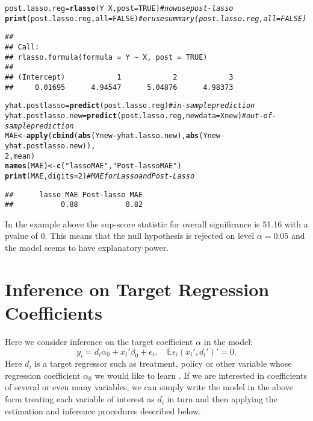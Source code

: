 \documentclass{amsart}\usepackage[]{graphicx}\usepackage[]{color}
\makeatletter
\newcommand{\hlnum}[1]{\textcolor[rgb]{0.686,0.059,0.569}{#1}}%
\newcommand{\hlstr}[1]{\textcolor[rgb]{0.192,0.494,0.8}{#1}}%
\newcommand{\hlcom}[1]{\textcolor[rgb]{0.678,0.584,0.686}{\textit{#1}}}%
\newcommand{\hlopt}[1]{\textcolor[rgb]{0,0,0}{#1}}%
\newcommand{\hlstd}[1]{\textcolor[rgb]{0.345,0.345,0.345}{#1}}%
\newcommand{\hlkwb}[1]{\textcolor[rgb]{0.69,0.353,0.396}{#1}}%
\newcommand{\hlkwc}[1]{\textcolor[rgb]{0.333,0.667,0.333}{#1}}%
\newcommand{\hlkwd}[1]{\textcolor[rgb]{0.737,0.353,0.396}{\textbf{#1}}}%
\newenvironment{kframe}{%
 \def\at@end@of@kframe{}%
 \ifinner\ifhmode%
  \def\at@end@of@kframe{\end{minipage}}%
  \begin{minipage}{\columnwidth}%
 \fi\fi%
 \def\FrameCommand##1{\hskip\@totalleftmargin \hskip-\fboxsep
 \colorbox{shadecolor}{##1}\hskip-\fboxsep
     \hskip-\linewidth \hskip-\@totalleftmargin \hskip\columnwidth}%
 \MakeFramed {\advance\hsize-\width
   \@totalleftmargin\z@ \linewidth\hsize
   \@setminipage}}%
 {\par\unskip\endMakeFramed%
 \at@end@of@kframe}
\newenvironment{knitrout}{}{} %
\makeatother
\begin{document}
\begin{knitrout}
\begin{kframe}
\begin{alltt}
\hlstd{post.lasso.reg} \hlkwb{=} \hlkwd{rlasso}\hlstd{(Y} \hlopt{~} \hlstd{X,} \hlkwc{post} \hlstd{=} \hlnum{TRUE}\hlstd{)}  \hlcom{#now use post-lasso}
\hlkwd{print}\hlstd{(post.lasso.reg,} \hlkwc{all} \hlstd{=} \hlnum{FALSE}\hlstd{)}  \hlcom{# or use  summary(post.lasso.reg, all=FALSE) }
\end{alltt}
\begin{verbatim}
## 
## Call:
## rlasso.formula(formula = Y ~ X, post = TRUE)
## 
## (Intercept)            1            2            3  
##     0.01695      4.94547      5.04876      4.98373
\end{verbatim}
\begin{alltt}
\hlstd{yhat.postlasso} \hlkwb{=} \hlkwd{predict}\hlstd{(post.lasso.reg)}  \hlcom{#in-sample prediction}
\hlstd{yhat.postlasso.new} \hlkwb{=} \hlkwd{predict}\hlstd{(post.lasso.reg,} \hlkwc{newdata} \hlstd{= Xnew)}  \hlcom{#out-of-sample prediction}
\hlstd{MAE} \hlkwb{<-} \hlkwd{apply}\hlstd{(}\hlkwd{cbind}\hlstd{(}\hlkwd{abs}\hlstd{(Ynew} \hlopt{-} \hlstd{yhat.lasso.new),} \hlkwd{abs}\hlstd{(Ynew} \hlopt{-} \hlstd{yhat.postlasso.new)),}
    \hlnum{2}\hlstd{, mean)}
\hlkwd{names}\hlstd{(MAE)} \hlkwb{<-} \hlkwd{c}\hlstd{(}\hlstr{"lasso MAE"}\hlstd{,} \hlstr{"Post-lasso MAE"}\hlstd{)}
\hlkwd{print}\hlstd{(MAE,} \hlkwc{digits} \hlstd{=} \hlnum{2}\hlstd{)}  \hlcom{# MAE for Lasso and Post-Lasso}
\end{alltt}
\begin{verbatim}
##      lasso MAE Post-lasso MAE 
##           0.88           0.82
\end{verbatim}
\end{kframe}
\end{knitrout}

In the example above the sup-score statistic for overall significance is 51.16 with a pvalue of 0. This means that the null hypothesis is rejected on level $\alpha=0.05$ and the model seems to have explanatory power.

\section{Inference on Target Regression Coefficients}

Here we consider inference on the target coefficient $\alpha$ in the model:
$$
y_i = d_i \alpha_0 + x_i'\beta_0 + \epsilon_i,   \quad \mathbb{E} \epsilon_i (x_i', d_i')' =0.
$$
Here $d_i$ is a target regressor such as treatment, policy or other variable whose regression coefficient $\alpha_0$ we would like to learn \citep{BelloniChernozhukovHansen2011}.  If we are interested in coefficients of several or even many variables, we can simply  write the model in the above form treating each variable of interest as $d_i$ in turn and then applying the estimation and inference procedures described below.
\end{document}
